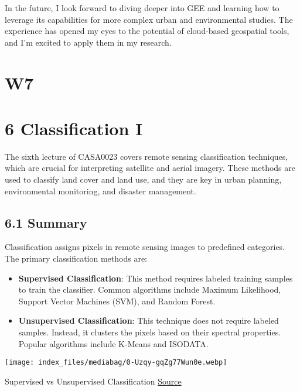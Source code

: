 \documentclass[
  letterpaper,
  DIV=11,
  numbers=noendperiod]{scrreprt}
\providecommand{\tightlist}{%
  \setlength{\itemsep}{0pt}\setlength{\parskip}{0pt}}\usepackage{longtable,booktabs,array}
\begin{document}
In the future, I look forward to diving deeper into GEE and learning how
to leverage its capabilities for more complex urban and environmental
studies. The experience has opened my eyes to the potential of
cloud-based geospatial tools, and I'm excited to apply them in my
research.


\chapter{W7}\label{w7}


\chapter{6 Classification I}\label{classification-i-1}

The sixth lecture of CASA0023 covers remote sensing classification
techniques, which are crucial for interpreting satellite and aerial
imagery. These methods are used to classify land cover and land use, and
they are key in urban planning, environmental monitoring, and disaster
management.

\section{6.1 Summary}\label{summary-4}

Classification assigns pixels in remote sensing images to predefined
categories. The primary classification methods are:

\begin{itemize}
\tightlist
\item
  \textbf{Supervised Classification}: This method requires labeled
  training samples to train the classifier. Common algorithms include
  Maximum Likelihood, Support Vector Machines (SVM), and Random Forest.
\item
  \textbf{Unsupervised Classification}: This technique does not require
  labeled samples. Instead, it clusters the pixels based on their
  spectral properties. Popular algorithms include K-Means and ISODATA.
\end{itemize}

\texttt{[image: index\_files/mediabag/0-Uzqy-gqZg77Wun0e.webp]}

Supervised vs Unsupervised Classification
\href{https://medium.com/@recrosoft.io/supervised-vs-unsupervised-learning-key-differences-cdd46206cdcb}{Source}
\end{document}
